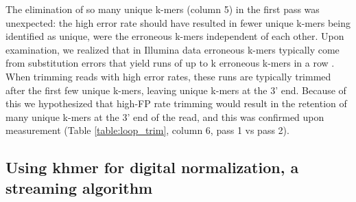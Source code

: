 \documentclass{article}
\begin{document}
\begin{table}[ht]
\caption{Iterative low-memory k-mer trimming.  The results of trimming
  reads at unique (erroneous) k-mers from a 165 Mbp short-read data
  set in under 40 MB of RAM.  After each iteration, we measured the
  total number of distinct k-mers in the data set, the total number
  of unique (and likely erroneous) k-mers remaining, and the
  number of unique k-mers present at the 3' end of reads.}

\label{table:loop_trim}

\end{table}

The elimination of so many unique k-mers (column 5) in the first pass
was unexpected: the high error rate should have resulted in
fewer unique k-mers being identified as unique, were the erroneous
k-mers independent of each other. Upon examination, we realized that
in Illumina data erroneous k-mers typically come from substitution
errors that yield runs of up to k erroneous k-mers in a row \cite{Kelley2010}.  When trimming reads with high error rates,
these runs are typically trimmed after the first few unique k-mers,
leaving unique k-mers at the 3' end.
Because of this we hypothesized that high-FP rate trimming would
result in the retention of many unique k-mers at the 3' end of the
read, and this was confirmed upon measurement (Table \ref{table:loop_trim}, column 6, pass 1 vs
pass 2).

\subsection{Using khmer for digital normalization, a streaming algorithm}
\end{document}
